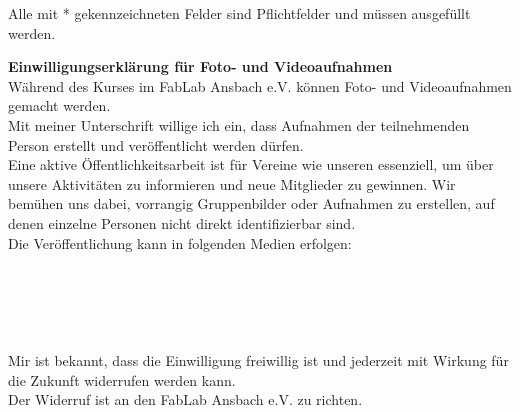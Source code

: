 \begin{Form}
	\setlength{\baselineskip}{1.2\baselineskip}
	\setlength{\parskip}{0.4ex}
	\hfill {}
\end{Form}

\vfill
{\small Alle mit * gekennzeichneten Felder sind Pflichtfelder und müssen ausgefüllt werden.}

\newpage

\begin{Form}
\setlength{\baselineskip}{1.35\baselineskip}
\setlength{\parskip}{0.6ex}

{\Large\textbf{Einwilligungserklärung für Foto- und Videoaufnahmen}} \\

Während des Kurses im FabLab Ansbach e.V. können Foto- und Videoaufnahmen gemacht werden. \\
Mit meiner Unterschrift willige ich ein, dass Aufnahmen der teilnehmenden Person erstellt und veröffentlicht werden dürfen. \\

Eine aktive Öffentlichkeitsarbeit ist für Vereine wie unseren essenziell, um über unsere Aktivitäten zu informieren und neue Mitglieder zu gewinnen. Wir bemühen uns dabei, vorrangig Gruppenbilder oder Aufnahmen zu erstellen, auf denen einzelne Personen nicht direkt identifizierbar sind. \\

Die Veröffentlichung kann in folgenden Medien erfolgen: \\
 \\
 \\
 \\
 \\

 \\

Mir ist bekannt, dass die Einwilligung freiwillig ist und jederzeit mit Wirkung für die Zukunft widerrufen werden kann. \\
Der Widerruf ist an den FabLab Ansbach e.V. zu richten. \\

\hfill
{} \\

\hfill
{} \\

\end{Form}


